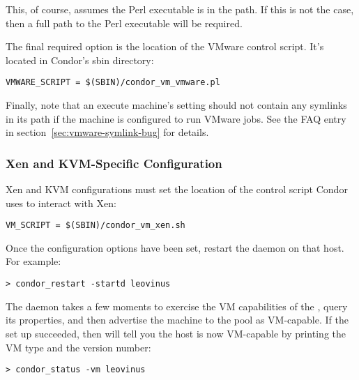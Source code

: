 This, of course, assumes the Perl executable is in the path.  If this is not 
the case, then a full path to the Perl executable will be required.

The final required option is the location of the VMware control script. It's
located in Condor's sbin directory:

\begin{verbatim}
VMWARE_SCRIPT = $(SBIN)/condor_vm_vmware.pl
\end{verbatim}

Finally, note that an execute machine's  setting should not
contain any symlinks in its path if the machine is configured to run VMware
jobs. See the FAQ entry in section~\ref{sec:vmware-symlink-bug} for details.

\subsubsection{Xen and KVM-Specific Configuration}

Xen and KVM configurations must set the location of the control script Condor
uses to interact with Xen:

\begin{verbatim}
VM_SCRIPT = $(SBIN)/condor_vm_xen.sh
\end{verbatim}


Once the configuration options have been set, restart the  
daemon on that host.  For example:

\begin{verbatim}
> condor_restart -startd leovinus
\end{verbatim}

The  daemon takes a few moments to exercise the VM
capabilities of the , query its properties, and then 
advertise the machine to the pool as VM-capable.  If the set up 
succeeded, then  will tell you the host is now 
VM-capable by printing the VM type and the version number:

\begin{verbatim}
> condor_status -vm leovinus
\end{verbatim}


